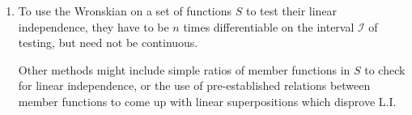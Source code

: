 \begin{enumerate}
\begin{enumerate}
                  \item To use the Wronskian on a set of functions $ S $ to test their
                        linear independence, they have to be $ n $ times differentiable
                        on the interval $  $ of testing, but need not be
                        continuous.
                        \par Other methods might include simple ratios of member
                        functions in $ S $ to check for linear independence, or the use
                        of pre-established relations between member functions to come
                        up with linear superpositions which disprove L.I.
            \end{enumerate}


\end{enumerate}